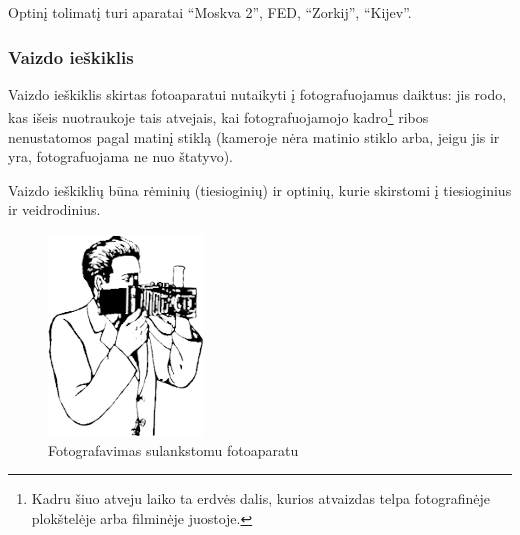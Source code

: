 \documentclass[12pt]{book}
\begin{document}
					Optinį tolimatį turi aparatai ``Moskva 2'', FED, ``Zorkij'', ``Kijev''.
				\subsubsection*{Vaizdo ieškiklis}
					Vaizdo ieškiklis skirtas fotoaparatui nutaikyti į fotografuojamus daiktus: jis rodo, kas išeis nuotraukoje tais atvejais, kai fotografuojamojo kadro\footnote{Kadru šiuo atveju laiko ta erdvės dalis, kurios atvaizdas telpa fotografinėje plokštelėje arba filminėje juostoje.} ribos nenustatomos pagal matinį stiklą (kameroje nėra matinio stiklo arba, jeigu jis ir yra, fotografuojama ne nuo štatyvo).

					Vaizdo ieškiklių būna rėminių (tiesioginių) ir optinių, kurie skirstomi į tiesioginius ir veidrodinius.
					\begin{figure}[!h]
						\centering
						\begin{minipage}[t]{0.4\textwidth}
							\includegraphics[width=\textwidth]{7-pav}
							\caption{Fotografavimas sulankstomu fotoaparatu}

\end{minipage}
\end{figure}
\end{document}
